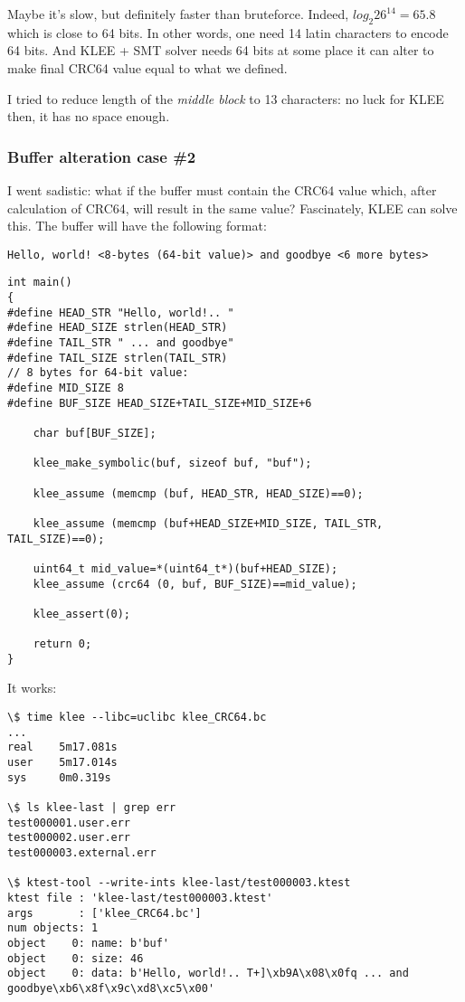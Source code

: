 Maybe it's slow, but definitely faster than bruteforce.
Indeed, $log_2{26^{14}}=65.8$ %
which is close to 64 bits.
In other words, one need 14 latin characters to encode 64 bits. %
And KLEE + SMT solver needs 64 bits at some place it can alter to make final CRC64 value equal to what we defined.

I tried to reduce length of the \textit{middle block} to 13 characters: no luck for KLEE then, it has no space enough.

\subsubsection{Buffer alteration case \#2}

I went sadistic: what if the buffer must contain the CRC64 value which, after calculation of CRC64, will result in the same value?
Fascinately, %
KLEE can solve this.
The buffer will have the following format:

\begin{lstlisting}
Hello, world! <8-bytes (64-bit value)> and goodbye <6 more bytes>
\end{lstlisting}

\begin{lstlisting}
int main()
{
#define HEAD_STR "Hello, world!.. "
#define HEAD_SIZE strlen(HEAD_STR)
#define TAIL_STR " ... and goodbye"
#define TAIL_SIZE strlen(TAIL_STR)
// 8 bytes for 64-bit value:
#define MID_SIZE 8
#define BUF_SIZE HEAD_SIZE+TAIL_SIZE+MID_SIZE+6

	char buf[BUF_SIZE];
  
	klee_make_symbolic(buf, sizeof buf, "buf");

	klee_assume (memcmp (buf, HEAD_STR, HEAD_SIZE)==0);

	klee_assume (memcmp (buf+HEAD_SIZE+MID_SIZE, TAIL_STR, TAIL_SIZE)==0);
	
	uint64_t mid_value=*(uint64_t*)(buf+HEAD_SIZE);
	klee_assume (crc64 (0, buf, BUF_SIZE)==mid_value);

	klee_assert(0);

	return 0;
}
\end{lstlisting}

It works:

\begin{lstlisting}
\$ time klee --libc=uclibc klee_CRC64.bc
...
real    5m17.081s
user    5m17.014s
sys     0m0.319s

\$ ls klee-last | grep err
test000001.user.err
test000002.user.err
test000003.external.err

\$ ktest-tool --write-ints klee-last/test000003.ktest
ktest file : 'klee-last/test000003.ktest'
args       : ['klee_CRC64.bc']
num objects: 1
object    0: name: b'buf'
object    0: size: 46
object    0: data: b'Hello, world!.. T+]\xb9A\x08\x0fq ... and goodbye\xb6\x8f\x9c\xd8\xc5\x00'
\end{lstlisting}


